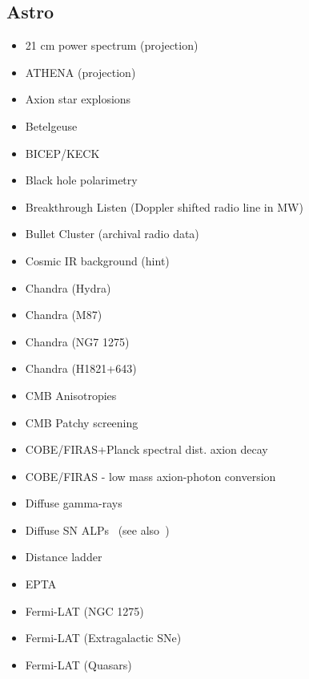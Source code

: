 \documentclass[8pt,twocolumn]{extarticle}
\begin{document}
\begin{mdframed}[everyline=true]
\subsection*{Astro}\vspace{-0.5em}
\begin{itemize}\setlength\itemsep{-0.5em}
	\item 21 cm power spectrum (projection)~\cite{Sun:2023acy}
	\item ATHENA (projection)~\cite{Sisk-Reynes:2022sqd}
	\item Axion star explosions~\cite{Escudero:2023vgv}
	\item Betelgeuse~\cite{Xiao:2020pra}
	\item BICEP/KECK~\cite{BICEPKeck:2021sbt}
	\item Black hole polarimetry~\cite{Gan:2023swl}
	\item Breakthrough Listen (Doppler shifted radio line in MW)~\cite{Keller:2021zbl}
    \item Bullet Cluster (archival radio data)~\cite{Chan:2021gjl}
  	\item Cosmic IR background (hint)~\cite{Kohri:2017ljt}
    \item Chandra (Hydra)~\cite{Wouters:2013hua}
    \item Chandra (M87)~\cite{Marsh:2017yvc}
    \item Chandra (NG7 1275)~\cite{Reynolds:2019uqt}
    \item Chandra (H1821+643)~\cite{Reynes:2021bpe}
    \item CMB Anisotropies~\cite{Capozzi:2023xie,Liu:2023nct}
       	\item CMB Patchy screening~\cite{Mondino:2024rif,Goldstein:2024mfp}
    \item COBE/FIRAS+Planck spectral dist. axion decay~\cite{Bolliet:2020ofj}
    \item COBE/FIRAS - low mass axion-photon conversion~\cite{Cyr:2024sbd}
    \item Diffuse gamma-rays~\cite{Caputo:2022mah}
    \item Diffuse SN ALPs~\cite{Calore:2021hhn} (see also~\cite{Calore:2020tjw})
    \item Distance ladder~\cite{Buen-Abad:2020zbd}
    \item EPTA~\cite{EPTA:2024gxu}
    \item Fermi-LAT (NGC 1275)~\cite{Fermi-LAT:2016nkz}
    \item Fermi-LAT (Extragalactic SNe)~\cite{Meyer:2020vzy}
   	\item Fermi-LAT (Quasars)~\cite{Davies:2022wvj}

\end{itemize}
\end{mdframed}
\end{document}
